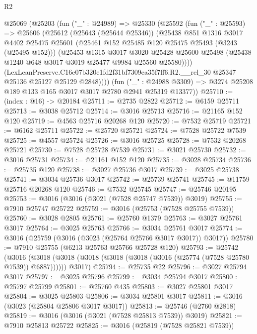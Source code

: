 \begin{lexlean}{R2}
\begin{coremodule}
  @25069
    (@25203
      (fun ("_" : @24989) =>
      @25330
        (@25592
          (fun ("_" : @25593) =>
          @25606
            (@25612
              (@25643 (@25644 @25346))
              (@25438
                @851
                @1316
                @3017
                @4402
                @25475
                @25601
                (@25461 @152 @25485 @120 @25475 @25493 (@3243 (@25495 @152)))
                (@25453
                  @1315
                  @3017
                  @3020
                  @25428
                  @25600
                  @25498
                  (@25438 @1240 @648 @3017 @3019 @25477 @9984 @25560 @25580))))
            (LexLeanPreserve.C16e07b320e1fd2f31bf7309ea35f7ff6.R2.__rel_30
              @25347
              @25136
              @25127
              @25129
              @2848))))
      (fun ("_" : @24988 @3309) =>
      @3274 @25208 @189 @133 @165 @3017 @3017 @2780 @2941 @25319 @13377))
@25710 := (index : @16) -> @20184
@25711 := @2735 @2822
@25712 := @6159 @25711
@25713 := @3038 @25712
@25714 := @3016 @25713
@25716 := @21165 @152 @120
@25719 := @4563 @25716 @20268 @120
@25720 := @7532 @25719
@25721 := @6162 @25711
@25722 := @25720 @25721
@25724 := @7528 @25722 @7539
@25725 := @4557 @25724
@25726 := @3016 @25725
@25728 := @7532 @20268 @25721
@25730 := @7528 @25728 @7539
@25731 := @3021 @25730
@25732 := @3016 @25731
@25734 := @21161 @152 @120
@25735 := @3028 @25734
@25736 := @25735 @120
@25738 := @3027 @25736 @3017
@25739 := @3025 @25738
@25741 := @3034 @25736 @3017
@25742 := @25739 @25741
@25745 := @11759 @25716 @20268 @120
@25746 := @7532 @25745
@25747 := @25746 @20195
@25753 := @3016 (@3016 (@3021 (@7528 @25747 @7539)) @3019)
@25755 := @7910 @25747 @25722
@25759 := @3016 (@25753 (@7528 @25755 @7539))
@25760 := @3028 @2805
@25761 := @25760 @1379
@25763 := @3027 @25761 @3017
@25764 := @3025 @25763
@25766 := @3034 @25761 @3017
@25774 := @3016 (@25759 (@3016 (@3023 (@25764 @25766 @3017 @3017)) @3017))
@25780 := @7910 @25755 (@6213 @25763 @25766 @25728 @120)
@25793 := @25742
    (@3016
      (@3018 (@3018 (@3018 (@3018 (@3018 (@3016 (@25774 (@7528 @25780 @7539)) @6887))))))
      @3017)
@25794 := @25735 @22
@25796 := @3027 @25794 @3017
@25797 := @3025 @25796
@25799 := @3034 @25794 @3017
@25800 := @25797 @25799
@25801 := @25760 @435
@25803 := @3027 @25801 @3017
@25804 := @3025 @25803
@25806 := @3034 @25801 @3017
@25811 := @3016 (@3023 (@25804 @25806 @3017 @3017))
@25813 := @25746 (@2760 @2818)
@25819 := @3016 (@3016 (@3021 (@7528 @25813 @7539)) @3019)
@25821 := @7910 @25813 @25722
@25825 := @3016 (@25819 (@7528 @25821 @7539))

\end{coremodule}
\end{lexlean}
